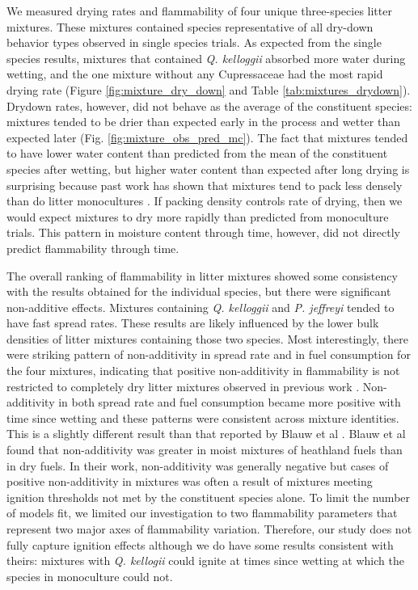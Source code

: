\documentclass[letterpaper,12pt]{article}
\begin{document}
We measured drying rates and flammability of four unique three-species litter
mixtures. These mixtures contained species representative of all dry-down
behavior types observed in single species trials. As expected from the single
species results, mixtures that contained \emph{Q. kelloggii} absorbed more
water during wetting, and the one mixture without any Cupressaceae had the most
rapid drying rate (Figure \ref{fig:mixture_dry_down} and Table
\ref{tab:mixtures_drydown}). Drydown rates, however, did not behave as the
average of the constituent species: mixtures tended to be drier than expected
early in the process and wetter than expected later (Fig.
\ref{fig:mixture_obs_pred_mc}). The fact that mixtures tended to have lower
water content than predicted from the mean of the constituent species after
wetting, but higher water content than expected after long drying is surprising
because past work has shown that mixtures tend to pack less densely than do
litter monocultures \citep[][, Table 2]{Magalhaes+Schwilk-2012}. If packing
density controls rate of drying, then we would expect mixtures to dry more
rapidly than predicted from monoculture trials. This pattern in moisture
content through time, however, did not directly predict flammability through
time.


The overall ranking of flammability in litter mixtures showed some consistency
with the results obtained for the individual species, but there were
significant non-additive effects. Mixtures containing \emph{Q. kelloggii} and
\emph{P. jeffreyi} tended to have fast spread rates. These results are likely
influenced by the lower bulk densities of litter mixtures containing those two
species. Most interestingly, there were striking pattern of non-additivity in
spread rate and in fuel consumption for the four mixtures, indicating that
positive non-additivity in flammability is not restricted to completely dry
litter mixtures observed in previous work \citep{Magalhaes+Schwilk-2012,
  VanAltena+Logtestjin+etal-2012}. Non-additivity in both spread rate and fuel
consumption became more positive with time since wetting and these patterns
were consistent across mixture identities. This is a slightly different result
than that reported by Blauw et al \citeyear{Blauw+Wensink+etal-2015}. Blauw et
al found that non-additivity was greater in moist mixtures of heathland fuels
than in dry fuels. In their work, non-additivity was generally negative but cases of 
positive non-additivity in mixtures was often a result of mixtures meeting
ignition thresholds not met by the constituent species alone. To limit the
number of models fit, we limited our investigation to two flammability
parameters that represent two major axes of flammability variation. Therefore,
our study does not fully capture ignition effects although we do have some
results consistent with theirs: mixtures with \emph{Q. kellogii} could ignite
at times since wetting at which the species in monoculture could not.
\end{document}
